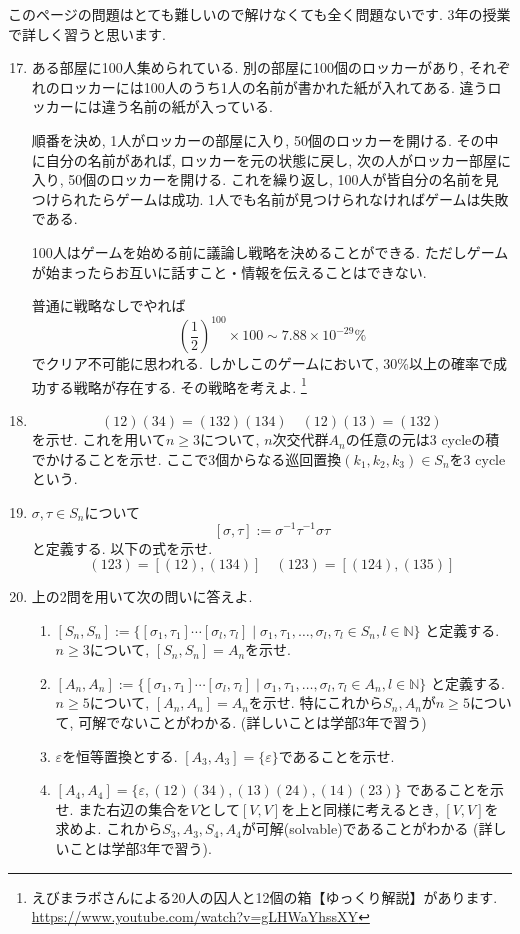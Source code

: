 \documentclass[dvipdfmx,a4paper,11pt]{article} %
\newcommand{\N}{\mathbb{N}}
\theoremstyle{definition}
\begin{document}
このページの問題はとても難しいので解けなくても全く問題ないです.
3年の授業で詳しく習うと思います. 
  \begin{enumerate}[label=\textbf{問題}\arabic*.]
 \setcounter{enumi}{16}
\item 
ある部屋に100人集められている. 別の部屋に100個のロッカーがあり, それぞれのロッカーには100人のうち1人の名前が書かれた紙が入れてある. 違うロッカーには違う名前の紙が入っている.

順番を決め, 1人がロッカーの部屋に入り, 50個のロッカーを開ける. その中に自分の名前があれば, ロッカーを元の状態に戻し, 次の人がロッカー部屋に入り, 50個のロッカーを開ける. これを繰り返し, 100人が皆自分の名前を見つけられたらゲームは成功. 1人でも名前が見つけられなければゲームは失敗である.

100人はゲームを始める前に議論し戦略を決めることができる. ただしゲームが始まったらお互いに話すこと・情報を伝えることはできない. 

普通に戦略なしでやれば
$$
\left( \frac{1}{2}\right)^{100} \times 100 
\sim
7.88 \times 10^{-29}
\%
$$
でクリア不可能に思われる. 
しかしこのゲームにおいて, 30\%以上の確率で成功する戦略が存在する. 
その戦略を考えよ. \footnote{えびまラボさんによる20人の囚人と12個の箱【ゆっくり解説】があります. \url{https://www.youtube.com/watch?v=gLHWaYhssXY}}
\item
$$
(12)(34) = (132)(134) 
\quad 
(12)(13) = (132)
$$
を示せ. 
これを用いて$n \ge 3$について, $n$次交代群$A_n$の任意の元は3 cycleの積でかけることを示せ. 
ここで3個からなる巡回置換$(k_1, k_2, k_3) \in S_n$を3 cycleという. 

 \item 
 $\sigma, \tau \in S_n$について
 $$
 [\sigma, \tau]:=\sigma^{-1}\tau^{-1}\sigma \tau
 $$
 と定義する. 以下の式を示せ. 
 $$
 (123) = [(12), (134)]
 \quad (123) = [(124), (135)]
 $$
 \item 上の2問を用いて次の問いに答えよ. 
 \begin{enumerate}
\item 
 $[S_n, S_n]:= \{  [\sigma_1, \tau_1]\cdots [\sigma_l, \tau_l] \mid \sigma_1, \tau_1, \ldots, \sigma_l, \tau_l \in S_n, l \in \N\}
 $
 と定義する. $n \ge 3$について, $[S_n, S_n]=A_{n}$を示せ.
\item 
$
[A_n, A_n]:= \{  [\sigma_1, \tau_1]\cdots [\sigma_l, \tau_l] \mid \sigma_1, \tau_1, \ldots, \sigma_l, \tau_l \in A_n, l \in \N\}
$
 と定義する. $n \ge 5$について, $[A_n, A_n]=A_{n}$を示せ.
特にこれから$S_n, A_n$が$n \ge 5$について, 可解でないことがわかる. (詳しいことは学部3年で習う)
\item $\varepsilon$を恒等置換とする. $[A_3, A_3]=\{\varepsilon\}$であることを示せ. 
\item 
$
[A_4, A_4]=\{ \varepsilon, (12)(34), (13)(24), (14)(23)\}
$
であることを示せ. また右辺の集合を$V$として$[V, V]$を上と同様に考えるとき, $[V, V]$を求めよ. 
これから$S_3, A_3, S_4, A_4$が可解(solvable)であることがわかる (詳しいことは学部3年で習う).
\end{enumerate}
\end{enumerate}
\end{document}
